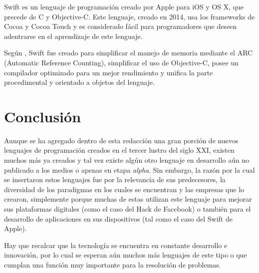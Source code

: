 \documentclass[a4paper,11pt]{article}
\begin{document}
Swift es un lenguaje de programación creado por Apple para iOS y OS X, que precede de C y Objective-C. Este lenguaje, creado en 2014, usa los frameworks de Cocoa y Cocoa Touch y es considerado fácil para programadores que deseen adentrarse en el aprendizaje de este lenguaje.

Según \cite{Apple}, Swift fue creado para simplificar el manejo de memoria mediante el ARC (Automatic Reference Counting), simplificar el uso de Objective-C, posee un compilador optimizado para un mejor rendimiento y unifica la parte procedimental y orientado a objetos del lenguaje.

\section*{Conclusión}

Aunque se ha agregado dentro de esta redacción una gran porción de nuevos lenguajes de programación creados en el tercer lustro del siglo XXI, existen muchos más ya creados y tal vez existe algún otro lenguaje en desarrollo aún no publicado a los medios o apenas en etapa \textit{alpha}. Sin embargo, la razón por la cual se insertaron estos lenguajes fue por la relevancia de sus predecesores, la diversidad de los paradigmas en los cuales se encuentran y las empresas que lo crearon, simplemente porque muchas de estas utilizan este lenguaje para mejorar sus plataformas digitales (como el caso del Hack de Facebook) o también para el desarrollo de aplicaciones en sus dispositivos (tal como el caso del Swift de Apple).

Hay que recalcar que la tecnología se encuentra en constante desarrollo e innovación, por lo cual se esperan aún muchos más lenguajes de este tipo o que cumplan una función muy importante para la resolución de problemas.
\end{document}

